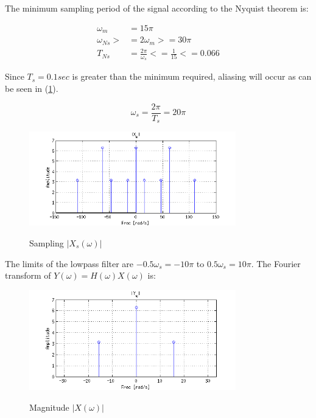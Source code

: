 The minimum sampling period of the signal according to the Nyquist theorem is:

\begin{equation*}
\begin{aligned}
\omega_m &= 15 \pi \\
\omega_{Ns} >&= 2 \omega_m >= 30 \pi \\
T_{Ns} &= \frac{2 \pi}{\omega_s} <= \frac{1}{15} <= 0.066
\end{aligned}
\end{equation*} 

Since $T_s = 0.1 sec$ is greater than the minimum required,
aliasing will occur as can be seen in (\ref{fig:c3p6a2}).

\begin{equation*}
\omega_s = \frac{2 \pi}{T_s} =  20 \pi
\end{equation*} 


\begin{figure}[H]
\caption{Sampling $|X_s(\omega)|$}
\centering
\includegraphics[width=0.8\textwidth]{figs/c3p6a2.png}
\label{fig:c3p6a2}
\end{figure}

The limits of the lowpass filter are $-0.5 \omega_s = -10 \pi$ to $0.5 \omega_s = 10 \pi$.
The Fourier transform of $Y(\omega) = H(\omega)X(\omega)$ is:

\begin{figure}[H]
\caption{Magnitude $|X(\omega)|$}
\centering
\includegraphics[width=0.8\textwidth]{figs/c3p6a3.png}
\label{fig:c3p6a3}
\end{figure}

